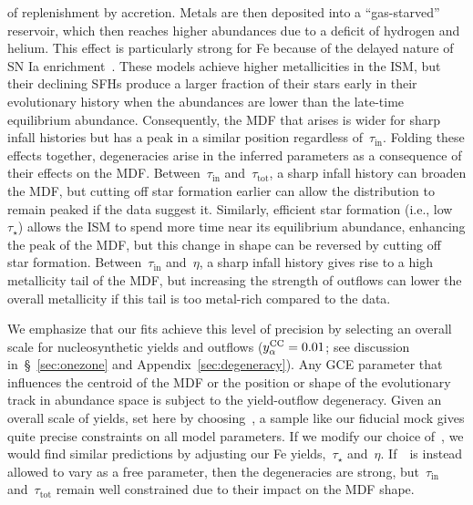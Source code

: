 \documentclass[foo.tex]{subfiles}
\begin{document}
of replenishment by accretion.
Metals are then deposited into a ``gas-starved'' reservoir, which then reaches
higher abundances due to a deficit of hydrogen and helium.
This effect is particularly strong for Fe because of the delayed nature of SN
Ia enrichment~\citep{Weinberg2017}.
These models achieve higher metallicities in the ISM, but their declining SFHs
produce a larger fraction of their stars early in their evolutionary history
when the abundances are lower than the late-time equilibrium abundance.
Consequently, the MDF that arises is wider for sharp infall histories but has
a peak in a similar position regardless of~$\tau_\text{in}$.
Folding these effects together, degeneracies arise in the inferred parameters
as a consequence of their effects on the MDF.
Between~$\tau_\text{in}$ and~$\tau_\text{tot}$, a sharp infall history can
broaden the MDF, but cutting off star formation earlier can allow the
distribution to remain peaked if the data suggest it.
Similarly, efficient star formation (i.e., low~$\tau_\star$) allows the ISM to
spend more time near its equilibrium abundance, enhancing the peak of the MDF,
but this change in shape can be reversed by cutting off star formation.
Between~$\tau_\text{in}$ and~$\eta$, a sharp infall history gives rise to a
high metallicity tail of the MDF, but increasing the strength of outflows
can lower the overall metallicity if this tail is too metal-rich compared to
the data.
\par
We emphasize that our fits achieve this level of precision by selecting an
overall scale for nucleosynthetic yields and outflows ($y_\alpha^\text{CC} = 0.01$; see
discussion in~\S~\ref{sec:onezone} and Appendix~\ref{sec:degeneracy}).
Any GCE parameter that influences the centroid of the MDF or the position or
shape of the evolutionary track in abundance space is subject to the
yield-outflow degeneracy.
Given an overall scale of yields, set here by choosing~\yacc, a sample like
our fiducial mock gives quite precise constraints on all model parameters.
If we modify our choice of~\yacc, we would find similar predictions by
adjusting our Fe yields,~$\tau_\star$ and~$\eta$.
If~\yacc~is instead allowed to vary as a free parameter, then the degeneracies
are strong, but~$\tau_\text{in}$ and~$\tau_\text{tot}$ remain well constrained
due to their impact on the MDF shape.
\end{document}
